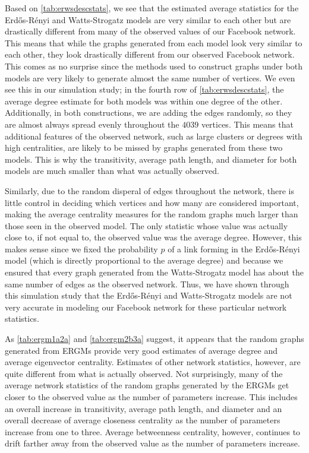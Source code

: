 \documentclass[12pt,twoside]{amherstthesis}
\begin{document}
  Based on \autoref{tab:erwsdescstats}, we see that the estimated average
  statistics for the Erdős-Rényi and Watts-Strogatz models are very
  similar to each other but are drastically different from many of the
  observed values of our Facebook network. This means that while the
  graphs generated from each model look very similar to each other, they
  look drastically different from our observed Facebook network. This
  comes as no surprise since the methods used to construct graphs under
  both models are very likely to generate almost the same number of
  vertices. We even see this in our simulation study; in the fourth row of
  \autoref{tab:erwsdescstats}, the average degree estimate for both models
  was within one degree of the other. Additionally, in both constructions,
  we are adding the edges randomly, so they are almost always spread
  evenly throughout the \(4039\) vertices. This means that additional
  features of the observed network, such as large clusters or degrees with
  high centralities, are likely to be missed by graphs generated from
  these two models. This is why the transitivity, average path length, and
  diameter for both models are much smaller than what was actually
  observed.
  
  Similarly, due to the random disperal of edges throughout the network,
  there is little control in deciding which vertices and how many are
  considered important, making the average centrality measures for the
  random graphs much larger than those seen in the observed model. The
  only statistic whose value was actually close to, if not equal to, the
  observed value was the average degree. However, this makes sense since
  we fixed the probability \(p\) of a link forming in the Erdős-Rényi
  model (which is directly proportional to the average degree) and because
  we ensured that every graph generated from the Watts-Strogatz model has
  about the same number of edges as the observed network. Thus, we have
  shown through this simulation study that the Erdős-Rényi and
  Watts-Strogatz models are not very accurate in modeling our Facebook
  network for these particular network statistics.
  
  As \autoref{tab:ergm1a2a} and \autoref{tab:ergm2b3a} suggest, it appears
  that the random graphs generated from ERGMs provide very good estimates
  of average degree and average eigenvector centrality. Estimates of other
  network statistics, however, are quite different from what is actually
  observed. Not surprisingly, many of the average network statistics of
  the random graphs generated by the ERGMs get closer to the observed
  value as the number of parameters increase. This includes an overall
  increase in transitivity, average path length, and diameter and an
  overall decrease of average closeness centrality as the number of
  parameters increase from one to three. Average betweenness centrality,
  however, continues to drift farther away from the observed value as the
  number of parameters increase.
  
\end{document}
